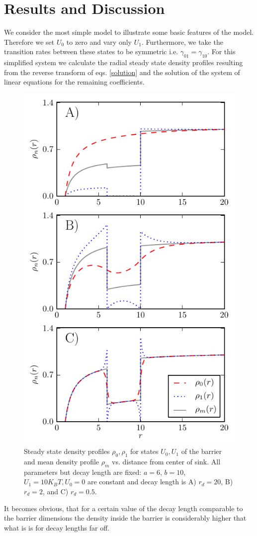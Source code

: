 \documentclass[twocolumn,superscriptaddress]{revtex4}
\begin{document}
\section{Results and Discussion}
We consider the most simple model to illustrate some basic features of the model. Therefore we set $U_0$ to zero and vary only $U_1$. Furthermore, we take the transition rates between these states to be symmetric i.e. $\gamma_{01}=\gamma_{10}$.
For this simplified system we calculate the radial steady state density profiles resulting from the reverse transform of eqs. \eqref{solution} and the solution of the system of linear equations for the remaining coefficients.
\begin{figure}[H]
\includegraphics[width= .5 \textwidth]{plots/density_profiles.pdf}
\caption{Steady state density profiles $\rho_0, \rho_1$ for states $U_0, U_1$ of the barrier and mean density profile $\rho_m$ vs. distance from center of sink. All parameters but decay length are fixed: $a=6$, $b=10$, $U_1 = 10 K_B T, U_0 = 0$ are constant and decay length is A) $r_d = 20$, B) $r_d=2$, and C) $r_d=0.5$.}
\label{fig1}
\end{figure}
It becomes obvious, that for a certain value of the decay length comparable to the barrier dimensions the density inside the barrier is considerably higher that what is is for decay lengths far off.
\end{document}
